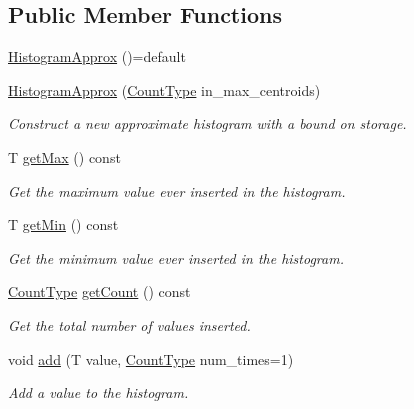 \subsection*{Public Member Functions}
\begin{DoxyCompactItemize}
\item 
\hyperlink{structvt_1_1util_1_1adt_1_1_histogram_approx_accb60fd3c6827b4bc3f8db9d688397b3}{Histogram\+Approx} ()=default
\item 
\hyperlink{structvt_1_1util_1_1adt_1_1_histogram_approx_a3b78cb4504ac095d913cefe1db3b442a}{Histogram\+Approx} (\hyperlink{structvt_1_1util_1_1adt_1_1_histogram_approx_aa2fb74665588d311da76dd821f2912c6}{Count\+Type} in\+\_\+max\+\_\+centroids)
\begin{DoxyCompactList}\small\item\em Construct a new approximate histogram with a bound on storage. \end{DoxyCompactList}\item 
T \hyperlink{structvt_1_1util_1_1adt_1_1_histogram_approx_a3beb5b6e74470f8b6bf295217d5ff843}{get\+Max} () const
\begin{DoxyCompactList}\small\item\em Get the maximum value ever inserted in the histogram. \end{DoxyCompactList}\item 
T \hyperlink{structvt_1_1util_1_1adt_1_1_histogram_approx_ab024713bdb28ef694096f3865236faa3}{get\+Min} () const
\begin{DoxyCompactList}\small\item\em Get the minimum value ever inserted in the histogram. \end{DoxyCompactList}\item 
\hyperlink{structvt_1_1util_1_1adt_1_1_histogram_approx_aa2fb74665588d311da76dd821f2912c6}{Count\+Type} \hyperlink{structvt_1_1util_1_1adt_1_1_histogram_approx_af61bc8614a5096610387643fc05bf2e9}{get\+Count} () const
\begin{DoxyCompactList}\small\item\em Get the total number of values inserted. \end{DoxyCompactList}\item 
void \hyperlink{structvt_1_1util_1_1adt_1_1_histogram_approx_a7d691b9a2139ae2d320a39c1d8fbabab}{add} (T value, \hyperlink{structvt_1_1util_1_1adt_1_1_histogram_approx_aa2fb74665588d311da76dd821f2912c6}{Count\+Type} num\+\_\+times=1)
\begin{DoxyCompactList}\small\item\em Add a value to the histogram. \end{DoxyCompactList}\item 

\end{DoxyCompactItemize}
